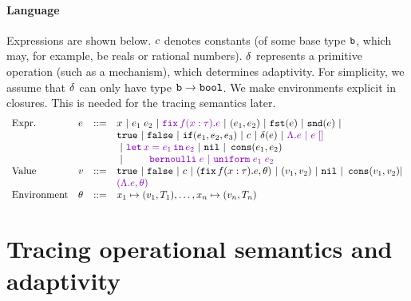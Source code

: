 \documentclass[a4paper,11pt]{article}
\newcommand{\wq}[1]{\textcolor[rgb]{.50,0.0,0.7}{ #1}}
\theoremstyle{definition}
\begin{document}
\paragraph{Language}
Expressions are shown below. $c$ denotes constants (of some base
type $\mathtt{b}$, which may, for example, be reals or rational
numbers). $\delta$ represents a primitive operation (such as a
mechanism), which determines adaptivity. For simplicity, we assume
that $\delta$ can only have type $\mathtt{b} \to \mathtt{bool}$. We make
environments explicit in closures. This is needed for the tracing
semantics later.
\[\begin{array}{llll}
\mbox{Expr.} & \expr & ::= & x ~|~ \expr_1 \eapp \expr_2 ~|~ \wq{\efix f(x:\type).\expr}
 ~|~ (\expr_1, \expr_2) ~|~ \eprojl(\expr) ~|~ \eprojr(\expr) ~| \\
%
& & & \etrue ~|~ \efalse ~|~ \eif(\expr_1, \expr_2, \expr_3) ~|~
\econst ~|~ \eop(\expr)  ~|~ \wq {\eilam \expr ~|~ \expr \eapp [] } \\
& & & ~|~ \wq {\elet  x = \expr_1 \ein \expr_2 } ~|~ \enil ~|~  \econs (
      \expr_1, \expr_2) \\
& & & ~|~ \wq{ ~~~~~~~
 \bernoulli \eapp \expr ~|~ \uniform \eapp \expr_1 \eapp
      \expr_2 } \\
%
\mbox{Value} & \valr & ::= & \etrue ~|~ \efalse ~|~ \econst ~|~
(\efix f(x:\type).\expr, \env) ~|~ (\valr_1, \valr_2) 
    ~|~ \enil ~|~ \econs (\valr_1, \valr_2) | \\
& & & \wq {(\eilam \expr , \env) } \\ 
%
\mbox{Environment} & \env & ::= & x_1 \mapsto (\valr_1, \tr_1), \ldots, x_n \mapsto (\valr_n,\tr_n)
\end{array}\]





\section{Tracing operational semantics and adaptivity}
\end{document}
